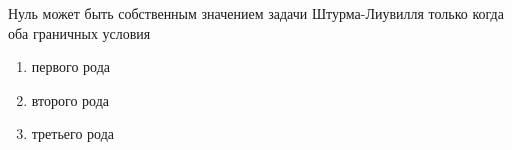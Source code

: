 Нуль может быть собственным значением задачи Штурма-Лиувилля только когда оба граничных условия

\begin{enumerate}[label=\arabic*)]
    \item первого рода
    \item второго рода
    \item третьего рода
\end{enumerate}

